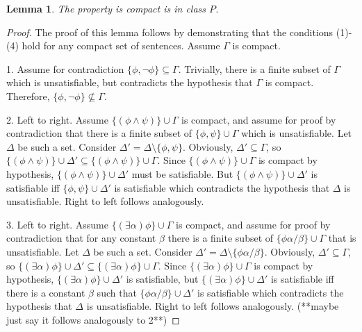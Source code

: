 \documentclass[12pt]{article}
\newtheorem{lemma}[theorem]{Lemma}
\theoremstyle{definition}
\theoremstyle{remark}
\begin{document}
\begin{lemma}
	\label{lem:compact-is-p}
	The property \textit{is compact} is in class $P$.
\end{lemma}

\begin{proof}
	The proof of this lemma follows by demonstrating that the conditions (1)-(4) hold for any compact set of sentences. Assume $\Gamma$ is compact.
	
	1. Assume for contradiction $\{ \phi, \neg\phi \} \subseteq \Gamma$. Trivially, there is a finite subset of $\Gamma$ which is unsatisfiable, but contradicts the hypothesis that $\Gamma$ is compact. Therefore, $\{ \phi, \neg\phi \} \not\subseteq \Gamma$.
	
	2. Left to right. Assume $\{ (\phi \land \psi) \} \cup \Gamma$ is compact, and assume for proof by contradiction that there is a finite subset of $\{ \phi, \psi \} \cup \Gamma$ which is unsatisfiable. Let $\Delta$ be such a set. Consider $\Delta' = \Delta \setminus \{ \phi, \psi \}$. Obviously, $\Delta' \subseteq \Gamma$, so $\{ (\phi \land \psi) \} \cup \Delta' \subseteq \{ (\phi \land \psi) \} \cup \Gamma$. Since $\{ (\phi \land \psi) \} \cup \Gamma$ is compact by hypothesis, $\{ (\phi \land \psi) \} \cup \Delta'$ must be satisfiable. But $\{ (\phi \land \psi) \} \cup \Delta'$ is satisfiable iff $\{ \phi, \psi \} \cup \Delta'$ is satisfiable which contradicts the hypothesis that $\Delta$ is unsatisfiable. Right to left follows analogously.
	
	3. Left to right. Assume $\{ (\exists \alpha)\phi \} \cup \Gamma$ is compact, and assume for proof by contradiction that for any constant $\beta$ there is a finite subset of $\{ \phi\alpha/\beta \} \cup \Gamma$ that is unsatisfiable. Let $\Delta$ be such a set. Consider $\Delta' = \Delta \setminus \{ \phi\alpha/\beta \}$. Obviously, $\Delta' \subseteq \Gamma$, so $\{ (\exists \alpha)\phi \} \cup \Delta' \subseteq \{ (\exists \alpha)\phi \} \cup \Gamma$. Since $\{ (\exists \alpha)\phi \} \cup \Gamma$ is compact by hypothesis, $\{ (\exists \alpha)\phi \} \cup \Delta'$ is satisfiable, but $\{ (\exists \alpha)\phi \} \cup \Delta'$ is satisfiable iff there is a constant $\beta$ such that $\{ \phi\alpha/\beta \} \cup \Delta'$ is satisfiable which contradicts the hypothesis that $\Delta$ is unsatisfiable. Right to left follows analogously. (**maybe just say it follows analogously to 2**)
	

\end{proof}
\end{document}
